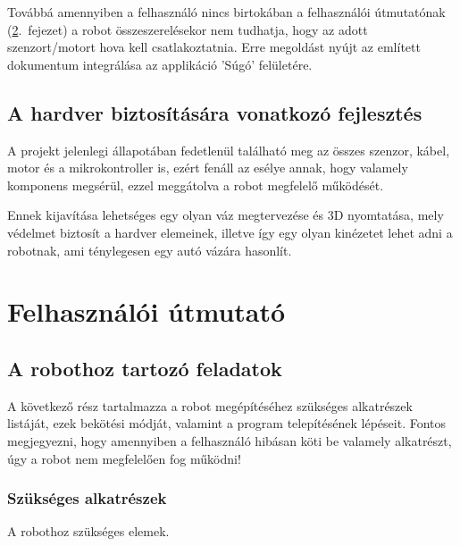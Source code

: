 \documentclass[]{thesis-ekf}
\theoremstyle{definition}
\begin{document}
Továbbá amennyiben a felhasználó nincs birtokában a felhasználói útmutatónak (\ref{felhaszn-útmutató}.~fejezet) a robot összeszerelésekor nem tudhatja, hogy az adott szenzort/motort hova kell csatlakoztatnia. Erre megoldást nyújt az említett dokumentum integrálása az applikáció 'Súgó' felületére.
\section{A hardver biztosítására vonatkozó fejlesztés}
A projekt jelenlegi állapotában fedetlenül található meg az összes szenzor, kábel, motor és a mikrokontroller is, ezért fenáll az esélye annak, hogy valamely komponens megsérül, ezzel meggátolva a robot megfelelő működését.

Ennek kijavítása lehetséges egy olyan váz megtervezése és 3D nyomtatása, mely védelmet biztosít a hardver elemeinek, illetve így egy olyan kinézetet lehet adni a robotnak, ami ténylegesen egy autó vázára hasonlít.
\chapter{Felhasználói útmutató}\label{felhaszn-útmutató}
\section{A robothoz tartozó feladatok}
A következő rész tartalmazza a robot megépítéséhez szükséges alkatrészek listáját, ezek bekötési módját, valamint a program telepítésének lépéseit. Fontos megjegyezni, hogy amennyiben a felhasználó hibásan köti be valamely alkatrészt, úgy a robot nem megfelelően fog működni!

\subsection{Szükséges alkatrészek}
A robothoz szükséges elemek.
\end{document}
